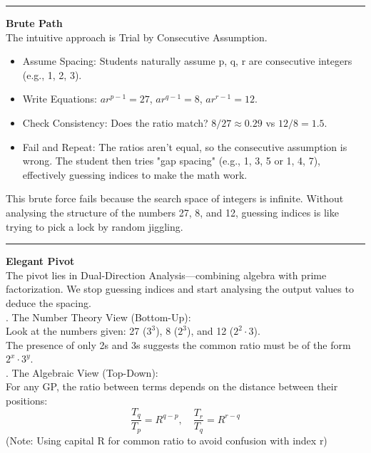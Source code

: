 \documentclass{article}
\begin{document}
\noindent \rule{\textwidth}{0.4pt}

\noindent \textbf{Brute Path} \\

\noindent The intuitive approach is Trial by Consecutive Assumption.
\begin{itemize}
    \item Assume Spacing: Students naturally assume p, q, r are consecutive integers (e.g., 1, 2, 3).
    \item Write Equations: $ar^{p-1}=27$, $ar^{q-1}=8$, $ar^{r-1}=12$.
    \item Check Consistency: Does the ratio match? $8/27 \approx 0.29$ vs $12/8 = 1.5$.
    \item Fail and Repeat: The ratios aren't equal, so the consecutive assumption is wrong. The student then tries "gap spacing" (e.g., 1, 3, 5 or 1, 4, 7), effectively guessing indices to make the math work.
\end{itemize}
\noindent This brute force fails because the search space of integers is infinite. Without analysing the structure of the numbers 27, 8, and 12, guessing indices is like trying to pick a lock by random jiggling. \\

\noindent \rule{\textwidth}{0.4pt}

\noindent \textbf{Elegant Pivot} \\

\noindent The pivot lies in Dual-Direction Analysis—combining algebra with prime factorization. We stop guessing indices and start analysing the output values to deduce the spacing. \\

. The Number Theory View (Bottom-Up): \\
\noindent Look at the numbers given: 27 ($3^3$), 8 ($2^3$), and 12 ($2^2 \cdot 3$). \\
\noindent The presence of only 2s and 3s suggests the common ratio must be of the form $2^x \cdot 3^y$. \\

. The Algebraic View (Top-Down): \\
\noindent For any GP, the ratio between terms depends on the distance between their positions:
\begin{equation*}
    \frac{T_q}{T_p} = R^{q-p}, \quad \frac{T_r}{T_q} = R^{r-q}
\end{equation*}
\noindent (Note: Using capital R for common ratio to avoid confusion with index r) \\
\end{document}

